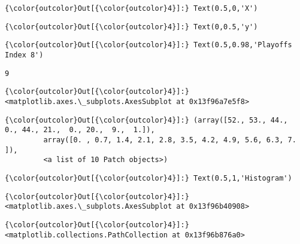 \documentclass[11pt]{article}
\begin{document}
\begin{Verbatim}[commandchars=\\\{\}]
{\color{outcolor}Out[{\color{outcolor}4}]:} Text(0.5,0,'X')
\end{Verbatim}
            
\begin{Verbatim}[commandchars=\\\{\}]
{\color{outcolor}Out[{\color{outcolor}4}]:} Text(0,0.5,'y')
\end{Verbatim}
            
\begin{Verbatim}[commandchars=\\\{\}]
{\color{outcolor}Out[{\color{outcolor}4}]:} Text(0.5,0.98,'Playoffs Index 8')
\end{Verbatim}
            
    \begin{Verbatim}[commandchars=\\\{\}]
9

    \end{Verbatim}

\begin{Verbatim}[commandchars=\\\{\}]
{\color{outcolor}Out[{\color{outcolor}4}]:} <matplotlib.axes.\_subplots.AxesSubplot at 0x13f96a7e5f8>
\end{Verbatim}
            
\begin{Verbatim}[commandchars=\\\{\}]
{\color{outcolor}Out[{\color{outcolor}4}]:} (array([52., 53., 44.,  0., 44., 21.,  0., 20.,  9.,  1.]),
         array([0. , 0.7, 1.4, 2.1, 2.8, 3.5, 4.2, 4.9, 5.6, 6.3, 7. ]),
         <a list of 10 Patch objects>)
\end{Verbatim}
            
\begin{Verbatim}[commandchars=\\\{\}]
{\color{outcolor}Out[{\color{outcolor}4}]:} Text(0.5,1,'Histogram')
\end{Verbatim}
            
\begin{Verbatim}[commandchars=\\\{\}]
{\color{outcolor}Out[{\color{outcolor}4}]:} <matplotlib.axes.\_subplots.AxesSubplot at 0x13f96b40908>
\end{Verbatim}
            
\begin{Verbatim}[commandchars=\\\{\}]
{\color{outcolor}Out[{\color{outcolor}4}]:} <matplotlib.collections.PathCollection at 0x13f96b876a0>
\end{Verbatim}
            
\end{document}
